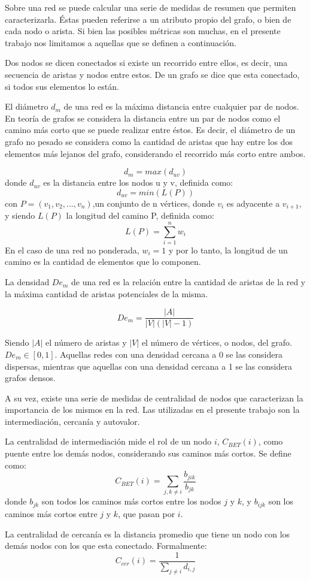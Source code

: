 \documentclass[class=article, crop=false]{standalone}
\begin{document}
Sobre una red se puede calcular una serie de medidas de resumen que permiten caracterizarla. Éstas pueden referirse a un atributo propio del grafo, o bien de cada nodo o arista. Si bien las posibles métricas son muchas, en el presente trabajo nos limitamos a aquellas que se definen a continuación. \par    
Dos nodos se dicen conectados si existe un recorrido entre ellos, es decir, una secuencia de aristas y nodos entre estos. De un grafo se dice que esta conectado, si todos sus elementos lo están. \par
El diámetro $d_m$ de una red es la máxima distancia entre cualquier par de nodos. En teoría de grafos se considera la distancia entre un par de nodos como el camino más corto que se puede realizar entre éstos. Es decir, el diámetro de un grafo no pesado se considera como la cantidad de aristas que hay entre los dos elementos más lejanos del grafo, considerando el recorrido más corto entre ambos. 

$$
d_m = max(d_{uv})
$$
donde $d_{uv}$ es la distancia entre los nodos u y v, definida como:
$$
d_{uv} = min(L(P))
$$
con $P = (v_1, v_2, ..., v_n)$,un conjunto de n vértices, donde $v_i$ es adyacente a $v_{i+1}$, y siendo $L(P)$ la longitud del camino P, definida como:
$$
L(P) = \sum_{i=1}^{n} w_i
$$
En el caso de una red no ponderada, $w_i = 1$ y por lo tanto, la longitud de un camino es la cantidad de elementos que lo componen. \par
La densidad $De_m$ de una red es la relación entre la cantidad de aristas de la red y la máxima cantidad de aristas potenciales de la misma. 

$$
De_m = \frac{|A|}{|V|(|V|-1)}
$$

Siendo $|A|$ el número de aristas y $|V|$ el número de vértices, o nodos, del grafo. $De_m \in [0,1]$. Aquellas redes con una densidad cercana a 0 se las considera dispersas, mientras que aquellas con una densidad cercana a 1 se las considera grafos densos. \par

A su vez, existe una serie de medidas de centralidad de nodos que caracterizan la importancia de los mismos en la red. Las utilizadas en el presente trabajo son la intermediación, cercanía y autovalor. \par
La centralidad de intermediación mide el rol de un nodo $i$, $C_{BET}(i)$, como puente entre los demás nodos, considerando sus caminos más cortos. Se define como:
$$
C_{BET}(i) = \sum_{j,k \neq i} \frac{b_{jik}}{b_{jk}}
$$
donde $b_{jk}$ son todos los caminos más cortos entre los nodos $j$ y $k$, y $b_{ijk}$ son los caminos más cortos entre $j$ y $k$, que pasan por $i$. \par
La centralidad de cercanía es la distancia promedio que tiene un nodo con los demás nodos con los que esta conectado. Formalmente: 
$$
C_{cer}(i) = \frac{1}{\displaystyle \sum_{j \neq i} d_{i,j} }
$$
\end{document}
